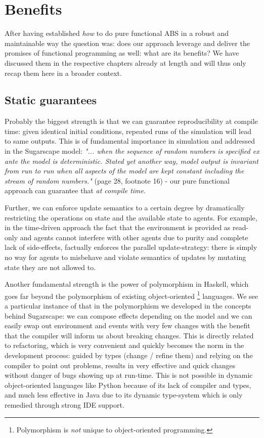 \section{Benefits}
After having established \textit{how} to do pure functional ABS in a robust and maintainable way the question was: does our approach leverage and deliver the promises of functional programming as well: what are its benefits? We have discussed them in the respective chapters already at length and will thus only recap them here in a broader context.

\subsection{Static guarantees}
Probably the biggest strength is that we can guarantee reproducibility at compile time: given identical initial conditions, repeated runs of the simulation will lead to same outputs. This is of fundamental importance in simulation and addressed in the Sugarscape model: \textit{"... when the sequence of random numbers is specified ex ante the model is deterministic. Stated yet another way, model output is invariant from run to run when all aspects of the model are kept constant including the stream of random numbers."} (page 28, footnote 16) - our pure functional approach can guarantee that \textit{at compile time}.

Further, we can enforce update semantics to a certain degree by dramatically restricting the operations on state and the available state to agents. For example, in the time-driven approach the fact that the environment is provided as read-only and agents cannot interfere with other agents due to purity and complete lack of side-effects, factually enforces the parallel update-strategy: there is simply no way for agents to misbehave and violate semantics of updates by mutating state they are not allowed to.

Another fundamental strength is the power of polymorphism in Haskell, which goes far beyond the polymorphism of existing object-oriented \footnote{Polymorphism is \textit{not} unique to object-oriented programming.} languages. We see a particular instance of that in the polymorphism we developed in the concepts behind Sugarscape: we can compose effects depending on the model and we can easily swap out environment and events with very few changes with the benefit that the compiler will inform us about breaking changes. This is directly related to refactoring, which is very convenient and quickly becomes the norm in the development process: guided by types (change / refine them) and relying on the compiler to point out problems, results in very effective and quick changes without danger of bugs showing up at run-time. This is not possible in dynamic object-oriented languages like Python because of its lack of compiler and types, and much less effective in Java due to its dynamic type-system which is only remedied through strong IDE support.

